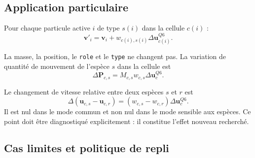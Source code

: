 \documentclass[11pt,a4paper]{article}
\newcommand{\code}[1]{\texttt{#1}}
\newcommand{\vect}[1]{\bm{#1}}
\begin{document}
\subsection{Application particulaire}

Pour chaque particule active \(i\) de type \(s(i)\) dans la cellule \(c(i)\) :
\begin{equation}
  \vect{v}'_i=\vect{v}_i+w_{c(i),s(i)}\Delta\vect{u}^{Q6}_{c(i)}.
\end{equation}

La masse, la position, le \code{role} et le \code{type} ne changent pas. La variation de quantité de mouvement de l'espèce \(s\) dans la cellule est
\begin{equation}
  \Delta\vect{P}_{c,s}=M_{c,s}w_{c,s}\Delta\vect{u}^{Q6}_c.
\end{equation}

Le changement de vitesse relative entre deux espèces \(s\) et \(r\) est
\begin{equation}
  \Delta(\vect{u}_{c,s}-\vect{u}_{c,r})
  =(w_{c,s}-w_{c,r})\Delta\vect{u}^{Q6}_c.
\end{equation}
Il est nul dans le mode commun et non nul dans le mode sensible aux espèces. Ce point doit être diagnostiqué explicitement : il constitue l'effet nouveau recherché.

\subsection{Cas limites et politique de repli}
\end{document}
